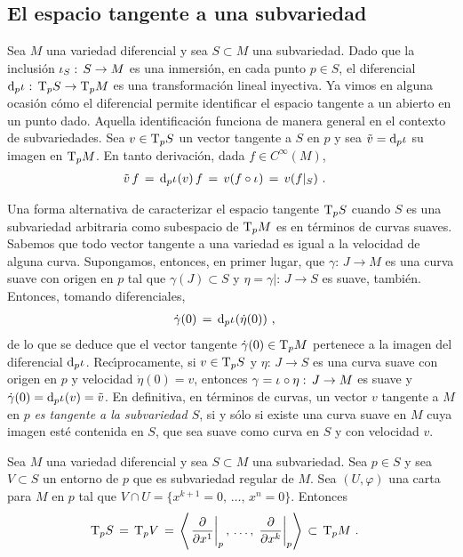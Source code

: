 \subsection{El espacio tangente a una subvariedad}
Sea $M$ una variedad diferencial y sea $S\subset M$ una subvariedad.
Dado que la inclusi\'{o}n $\inc[S]:\,S\rightarrow M$ es una inmersi\'{o}n,
en cada punto $p\in S$, el diferencial $\diferencial[p]{\inc}:%
\,\tangente[p]{S}\rightarrow\tangente[p]{M}$ es una transformaci\'{o}n
lineal inyectiva. Ya vimos en alguna ocasi\'{o}n c\'{o}mo el diferencial
permite identificar el espacio tangente a un abierto en un punto dado.
Aquella identificaci\'{o}n funciona de manera general en el contexto de
subvariedades. Sea $v\in\tangente[p]{S}$ un vector tangente a $S$ en $p$ y
sea $\tilde{v}=\diferencial[p]{\inc}$ su imagen en $\tangente[p]{M}$.
En tanto derivaci\'{o}n, dada $f\in C^{\infty}(M)$,
\begin{align*}
	\tilde{v}\,f & \,=\,\diferencial[p]{\inc}(v)\,f \,=\,
		v(f\circ\inc) \,=\,v(f|_{S})
	\text{ .}
\end{align*}
%

Una forma alternativa de caracterizar el espacio tangente $\tangente[p]{S}$
cuando $S$ es una subvariedad arbitraria como subespacio de
$\tangente[p]{M}$ es en t\'{e}rminos de curvas suaves. Sabemos que
todo vector tangente a una variedad es igual a la velocidad de alguna curva.
Supongamos, entonces, en primer lugar, que $\gamma:\,J\rightarrow M$ es una
curva suave con origen en $p$ tal que $\gamma(J)\subset S$ y
$\eta=\gamma|:\,J\rightarrow S$ es suave, tambi\'{e}n. Entonces, tomando
diferenciales,
\begin{align*}
	\dot{\gamma}(0) & \,=\,\diferencial[p]{\inc}(\dot{\eta}(0))
	\text{ ,}
\end{align*}
%
de lo que se deduce que el vector tangente $\dot{\gamma}(0)\in\tangente[p]{M}$
pertenece a la imagen del diferencial $\diferencial[p]{\inc}$.
Rec\'{\i}procamente, si $v\in\tangente[p]{S}$ y $\eta:\,J\rightarrow S$ es
una curva suave con origen en $p$ y velocidad $\dot{\eta}(0)=v$, entonces
$\gamma=\inc\circ\eta:\,J\rightarrow M$ es suave y
$\dot{\gamma}(0)=\diferencial[p]{\inc}(v)=\tilde{v}$. En definitiva,
en t\'{e}rminos de curvas, un vector $v$ tangente a $M$ en $p$
\emph{es tangente a la subvariedad $S$}, si y s\'{o}lo si existe una curva
suave en $M$ cuya imagen est\'{e} contenida en $S$, que sea suave como
curva en $S$ y con velocidad $v$.

\begin{propoTangenteSubvarCoordenadas}\label{thm:tangentesubvarcoordenadas}
	Sea $M$ una variedad diferencial y sea $S\subset M$ una subvariedad.
	Sea $p\in S$ y sea $V\subset S$ un entorno de $p$ que es subvariedad
	regular de $M$. Sea $(U,\varphi)$ una carta para $M$ en $p$ tal que
	$V\cap U=\{x^{k+1}=0,\,\dots,\,x^{n}=0\}$. Entonces
	\begin{align*}
		\tangente[p]{S} & \,=\,\tangente[p]{V} \,=\,
		\generado{\gancho[p]{x^{1}},\,\dots,\,\gancho[p]{x^{k}}}
		\,\subset\,\tangente[p]{M}
		\text{ .}
	\end{align*}
\end{propoTangenteSubvarCoordenadas}

